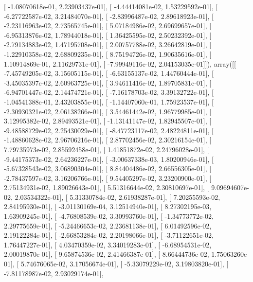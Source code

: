 \documentclass{article}
\begin{document}
       [ -1.08070618e-01,   2.23903437e-01],
       [ -4.44414081e-02,   1.53229592e-01],
       [ -6.27722587e-02,   3.21484070e-01],
       [ -2.83996487e-02,   2.89618923e-01],
       [ -2.23116963e-02,   2.73565745e-01],
       [  5.07184986e-02,   2.69699657e-01],
       [ -6.95313876e-02,   1.78944018e-01],
       [  1.36425595e-02,   2.50232392e-01],
       [ -2.79134883e-02,   1.47195708e-01],
       [  2.00757788e-02,   3.26642819e-01],
       [ -1.22910358e-02,   2.68809235e-01],
       [  8.75194726e-02,   1.90635616e-01],
       [  1.10914869e-01,   2.11629731e-01],
       [ -7.99949116e-02,   2.04153035e-01]]), array([[ -7.45749205e-02,   3.15605115e-01],
       [ -6.63155137e-02,   1.44760444e-01],
       [ -3.45035397e-02,   2.60963725e-01],
       [  3.94611416e-02,   1.89705831e-01],
       [ -6.94701447e-02,   2.14474721e-01],
       [ -7.16178703e-02,   3.39132722e-01],
       [ -1.04541388e-01,   2.43203855e-01],
       [ -1.14407060e-01,   1.75923537e-01],
       [ -2.30930321e-02,   2.06138266e-01],
       [  3.54461442e-02,   1.96779985e-01],
       [  3.12995382e-02,   2.89493521e-01],
       [ -1.13141147e-02,   1.82945507e-01],
       [ -9.48588729e-02,   2.25430029e-01],
       [ -8.47723117e-02,   2.48224811e-01],
       [ -1.48860628e-02,   2.96706216e-01],
       [  2.87702456e-02,   2.30216154e-01],
       [  7.79735973e-02,   2.85592458e-01],
       [  1.41851872e-02,   2.24796028e-01],
       [ -9.44175373e-02,   2.64236227e-01],
       [ -3.00637338e-03,   1.80200946e-01],
       [ -5.67328543e-02,   3.06890304e-01],
       [  8.84404486e-02,   2.66556305e-01],
       [ -2.78437597e-02,   3.16206766e-01],
       [  9.54405297e-02,   3.23200900e-01],
       [  2.75134931e-02,   1.89026643e-01],
       [  5.51316644e-02,   2.30810697e-01],
       [  9.09694607e-02,   2.03534322e-01],
       [  5.31330784e-02,   2.61938287e-01],
       [  7.20255593e-02,   2.84195930e-01],
       [ -3.01130169e-04,   3.12514940e-01],
       [  8.27302195e-03,   1.63909245e-01],
       [ -4.76808539e-02,   3.30993760e-01],
       [ -1.34773772e-02,   2.29775659e-01],
       [ -5.24466653e-02,   2.23681138e-01],
       [  6.01492596e-02,   2.19122284e-01],
       [ -2.66853284e-02,   2.20198066e-01],
       [ -3.71122651e-02,   1.76447227e-01],
       [  4.03470359e-02,   3.34019283e-01],
       [ -6.68954531e-02,   2.00019870e-01],
       [  9.65874536e-02,   2.41466387e-01],
       [  8.66444736e-02,   1.75063260e-01],
       [  5.74676065e-02,   3.17056674e-01],
       [ -5.33079229e-02,   3.19803820e-01],
       [ -7.81178987e-02,   2.93029174e-01],
\end{document}
